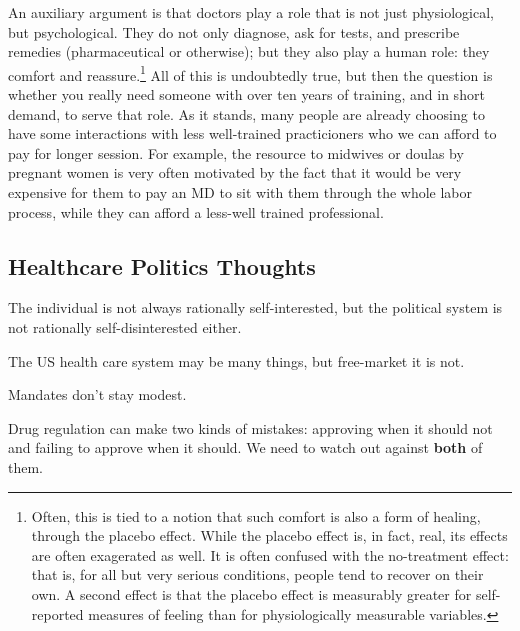 An auxiliary argument is that doctors play a role that is not just
physiological, but psychological. They do not only diagnose, ask for tests, and
prescribe remedies (pharmaceutical or otherwise); but they also play a human
role: they comfort and reassure.\footnote{Often, this is tied to a notion that
such comfort is also a form of healing, through the placebo effect. While the
placebo effect is, in fact, real, its effects are often exagerated as well. It
is often confused with the no-treatment effect: that is, for all but very
serious conditions, people tend to recover on their own. A second effect is
that the placebo effect is measurably greater for self-reported measures of
feeling than for physiologically measurable variables.} All of this is
undoubtedly true, but then the question is whether you really need someone with
over ten years of training, and in short demand, to serve that role. As it
stands, many people are already choosing to have some interactions with less
well-trained practicioners who we can afford to pay for longer session.  For
example, the resource to midwives or doulas by pregnant women is very often
motivated by the fact that it would be very expensive for them to pay an MD to
sit with them through the whole labor process, while they can afford a
less-well trained professional.

\subsection{Healthcare Politics Thoughts}

\thought The individual is not always rationally self-interested, but the
political system is not rationally self-disinterested either.

\thought The US health care system may be many things, but free-market it is
not.

\thought Mandates don't stay modest.

\thought Drug regulation can make two kinds of mistakes: approving when it
should not and failing to approve when it should. We need to watch out against
\textbf{both} of them.


